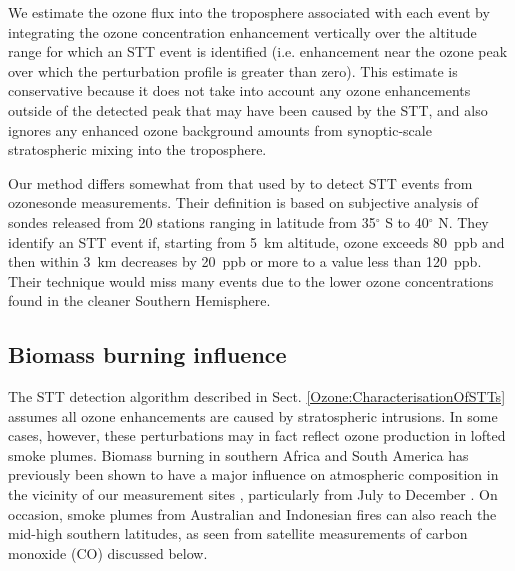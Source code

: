     We estimate the ozone flux into the troposphere associated with each event by integrating the ozone concentration enhancement vertically over the altitude range for which an STT event is identified (i.e. enhancement near the ozone peak over which the perturbation profile is greater than zero).
    This estimate is conservative because it does not take into account any ozone enhancements outside of the detected peak that may have been caused by the STT, and also ignores any enhanced ozone background amounts from synoptic-scale stratospheric mixing into the troposphere.
    
    Our method differs somewhat from that used by \citet{Tang2010} to detect STT events from ozonesonde measurements. 
    Their definition is based on subjective analysis of sondes released from 20 stations ranging in latitude from 35$^\circ$ S to 40$^\circ$ N.
    They identify an STT event if, starting from 5~km altitude, ozone exceeds 80~ppb and then within 3~km decreases by 20~ppb or more to a value less than 120~ppb.
    Their technique would miss many events due to the lower ozone concentrations found in the cleaner Southern Hemisphere.
  
  \subsection{Biomass burning influence}
    \label{Ozone:BiomassBurning}
    The STT detection algorithm described in Sect. \ref{Ozone:CharacterisationOfSTTs} assumes all ozone enhancements are caused by stratospheric intrusions.
    In some cases, however, these perturbations may in fact reflect ozone production in lofted smoke plumes.
    Biomass burning in southern Africa and South America has previously been shown to have a major influence on atmospheric composition in the vicinity of our measurement sites \citep{Oltmans2001, Gloudemans2006, Edwards2006}, particularly from July to December \citep{Pak2003, Liu2017}.
    On occasion, smoke plumes from Australian and Indonesian fires can also reach the mid-high southern latitudes, as seen from satellite measurements of carbon monoxide (CO) discussed below. %
    
